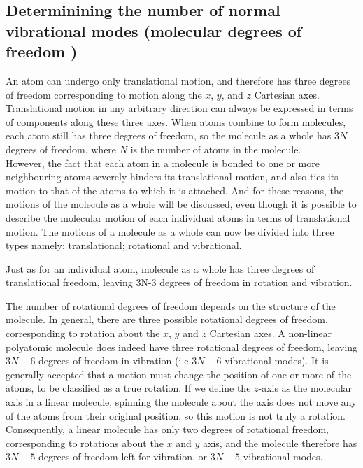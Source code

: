 \documentclass[a4paper, 12pt, openany]{report}
\begin{document}
 \subsection{Determinining the number of normal vibrational modes (molecular degrees of freedom )}
 An atom can undergo only translational motion, and therefore has three \break degrees of freedom corresponding to motion along the $x$, $y$, and $z$ Cartesian axes.  Translational motion in any arbitrary direction can always be expressed in terms of components along these three axes. When atoms combine to form molecules, each atom still has three degrees of freedom, so the molecule as a whole has $3N$ degrees of freedom, where $N$ is the number of atoms in the molecule.\\However, the fact that each atom in a molecule is bonded to one or more \linebreak neighbouring atoms severely hinders its translational motion, and also ties its motion to that of the atoms to which it is
 attached. And for these reasons, the motions of the molecule as a whole will be discussed, even though it is possible to describe the molecular motion of each individual atoms in terms of translational motion. The motions of a molecule as a whole can now be divided into three types  namely: translational; rotational and vibrational.
 
 Just as for an individual atom, molecule as a whole has three degrees of translational freedom, leaving 3N-3 degrees of freedom in rotation and vibration.
 
 The number of rotational degrees of freedom depends on the structure of the molecule. In general, there are three possible rotational degrees of \break freedom,  corresponding to rotation about the $x$, $y$ and $z$ Cartesian axes. A non-linear  polyatomic molecule does indeed have three rotational degrees of freedom, leaving $3N-6$  degrees of freedom in vibration (i.e $3N-6$ vibrational modes). It is generally accepted that a motion must change the position of one or more of the atoms, to be classified as a true rotation. If we define the $z$-axis as the molecular axis in a linear molecule, spinning the molecule about the axis does not move any of the atoms from their original position, so this motion is not truly a  rotation. Consequently, a linear molecule has only two degrees of rotational  freedom, corresponding to rotations about the $x$ and $y$ axis, and  the molecule therefore has $3N-5$ degrees of freedom left for vibration, or $3N-5$ vibrational modes.
\end{document}
